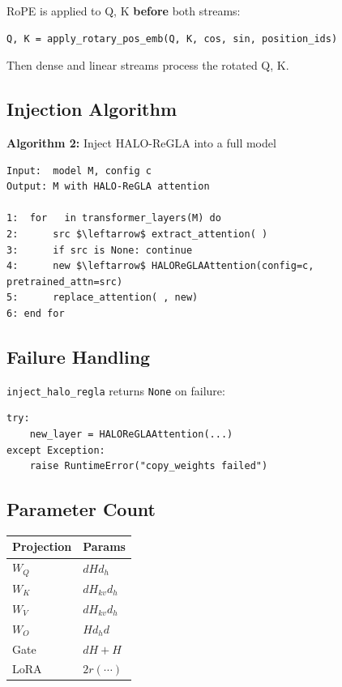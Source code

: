 RoPE is applied to Q, K \textbf{before} both streams:

\begin{lstlisting}
Q, K = apply_rotary_pos_emb(Q, K, cos, sin, position_ids)
\end{lstlisting}

Then dense and linear streams process the rotated Q, K.

\subsection{Injection Algorithm}

\textbf{Algorithm 2:} Inject HALO-ReGLA into a full model
\begin{lstlisting}
Input:  model M, config c
Output: M with HALO-ReGLA attention

1:  for   in transformer_layers(M) do
2:      src $\leftarrow$ extract_attention( )
3:      if src is None: continue
4:      new $\leftarrow$ HALOReGLAAttention(config=c, pretrained_attn=src)
5:      replace_attention( , new)
6: end for
\end{lstlisting}

\subsection{Failure Handling}

\texttt{inject\_halo\_regla} returns \texttt{None} on failure:

\begin{lstlisting}
try:
    new_layer = HALOReGLAAttention(...)
except Exception:
    raise RuntimeError("copy_weights failed")
\end{lstlisting}

\subsection{Parameter Count}

\begin{table}[H]
\centering
\small
\begin{tabular}{ll}
\toprule
\textbf{Projection} & \textbf{Params} \\
\midrule
$W_Q$ & $d H d_h$ \\
$W_K$ & $d H_{kv} d_h$ \\
$W_V$ & $d H_{kv} d_h$ \\
$W_O$ & $H d_h d$ \\
Gate & $d H + H$ \\
LoRA & $2 r (\cdots)$ \\
\bottomrule
\end{tabular}
\end{table}

